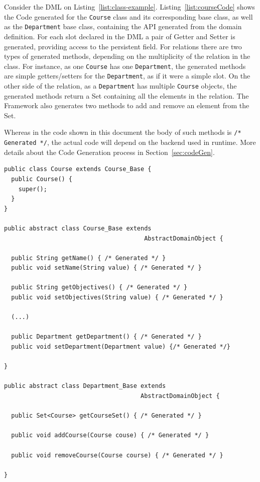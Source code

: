 Consider the DML on
Listing~\ref{list:class-example}. Listing~\ref{list:courseCode} shows
the Code generated for the \texttt{Course} class and its corresponding
base class, as well as the \texttt{Department} base class, containing
the API generated from the domain definition. For each slot declared
in the DML a pair of Getter and Setter is generated, providing access
to the persistent field. For relations there are two types of
generated methods, depending on the multiplicity of the relation in
the class. For instance, as one \texttt{Course} has one
\texttt{Department}, the generated methods are simple getters/setters
for the \texttt{Department}, as if it were a simple slot. On the other
side of the relation, as a \texttt{Department} has multiple
\texttt{Course} objects, the generated methods return a Set containing
all the elements in the relation. The Framework also generates two
methods to add and remove an element from the Set.

Whereas in the code shown in this document the body of such methods is
\texttt{/* Generated */}, the actual code will depend on the backend
used in runtime. More details about the Code Generation process in
Section~\ref{sec:codeGen}.

\begin{lstlisting}[caption={Generated Course class},
label={list:courseCode}, float]
public class Course extends Course_Base {
  public Course() {
    super();
  }
}

public abstract class Course_Base extends
                                       AbstractDomainObject {

  public String getName() { /* Generated */ }
  public void setName(String value) { /* Generated */ }

  public String getObjectives() { /* Generated */ }
  public void setObjectives(String value) { /* Generated */ }

  (...)

  public Department getDepartment() { /* Generated */ }
  public void setDepartment(Department value) {/* Generated */}

}

public abstract class Department_Base extends
                                      AbstractDomainObject {

  public Set<Course> getCourseSet() { /* Generated */ }

  public void addCourse(Course couse) { /* Generated */ }

  public void removeCourse(Course course) { /* Generated */ }

}
\end{lstlisting}

